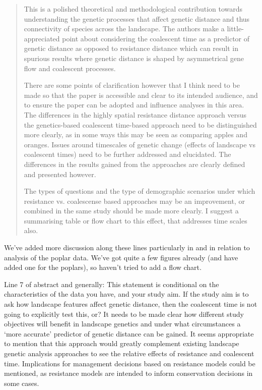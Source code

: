 \begin{quote}
    This is a polished theoretical and methodological contribution towards
    understanding the genetic processes that affect genetic distance and thus
    connectivity of species across the landscape. The authors make a
    little-appreciated point about considering the coalescent time as a
    predictor of genetic distance as opposed to resistance distance which can
    result in spurious results  where genetic distance is shaped by
    asymmetrical gene flow and coalescent processes.

    There are some points of clarification however that I think need to be made
    so that the paper is accessible and clear to its intended audience, and to
    ensure the paper can be adopted and influence analyses in this area. The
    differences in the highly spatial resistance distance approach versus the
    genetics-based coalescent time-based approach need to be distinguished more
    clearly, as in some ways this may be seen as comparing apples and oranges.
    Issues around timescales of genetic change (effects of landscape vs
    coalescent times) need to be further addressed and elucidated.  The
    differences in the results gained from the approaches are clearly defined
    and presented however.

    The types of questions and the type of demographic scenarios under which
    resistance vs. coalescense based approaches may be an improvement, or
    combined in the same study should be made more clearly. I suggest a
    summarising table or flow chart to this effect, that addresses time scales
    also.
\end{quote}

We've added more discussion along these lines
particularly in {} 
and in relation to analysis of the poplar data.
We've got quite a few figures already (and have added one for the poplars),
so haven't tried to add a flow chart.

\begin{point}{Line 7 of abstract and generally:}
    This statement is conditional on the characteristics of the data you have, and
    your study aim. If the study aim is to  ask how landscape features affect
    genetic distance, then the coalescent time is not going to explicitly test
    this, or? It needs to be made clear how different study objectives will
    benefit in landscape genetics and under what circumstances a `more
    accurate' predictor of genetic distance can be gained. It seems appropriate
    to mention that this approach would greatly complement existing landscape
    genetic analysis approaches to see the relative effects of resistance and
    coalescent time. Implications for management decisions based on resistance
    models could be mentioned, as resistance models are intended to inform
    conservation decisions in some cases.
\end{point}

